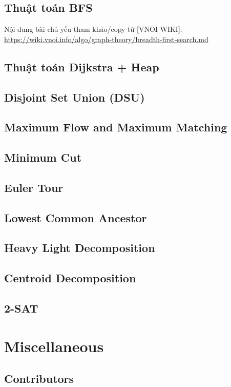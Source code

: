 \documentclass{article}
\begin{document}
\subsection{Thuật toán BFS}

Nội dung bài chủ yếu tham khảo/copy từ [VNOI WIKI]: \url{https://wiki.vnoi.info/algo/graph-theory/breadth-first-search.md}





\subsection{Thuật toán Dijkstra + Heap}

\subsection{Disjoint Set Union (DSU)}

\subsection{Maximum Flow and Maximum Matching}

\subsection{Minimum Cut}
\subsection{Euler Tour}
\subsection{Lowest Common Ancestor}
\subsection{Heavy Light Decomposition}
\subsection{Centroid Decomposition}
\subsection{2-SAT}



\section{Miscellaneous}

\subsection{Contributors}



\printbibliography[heading=bibintoc]
	
\end{document}
